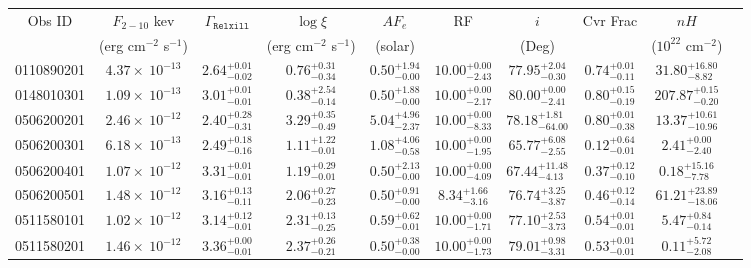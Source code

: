 \documentclass{article}
\begin{document}
\begin{landscape}
\begin{longtable}{cccccccccl}
\hline \multicolumn{1}{c}{Obs ID} & \multicolumn{1}{c}{$F_{2-10}$ kev} & \multicolumn{1}{c}{$\Gamma_\texttt{Relxill}$} & \multicolumn{1}{c}{$\log \xi$} & \multicolumn{1}{c}{$AF_e$} & \multicolumn{1}{c}{RF} & \multicolumn{1}{c}{$\textit{i}$} & \multicolumn{1}{c}{Cvr Frac} & \multicolumn{1}{c}{$nH$}\\  
\multicolumn{1}{c}{} & \multicolumn{1}{c}{(erg cm$^{-2}$ s$^{-1}$)} & \multicolumn{1}{c}{} & \multicolumn{1}{c}{(erg cm$^{-2}$ s$^{-1}$)} & \multicolumn{1}{c}{(solar)} & \multicolumn{1}{c}{} & \multicolumn{1}{c}{(Deg)} & \multicolumn{1}{c}{} & \multicolumn{1}{l}{($10^{22}$ cm$^{-2}$)}\\ \hline 
0110890201 & $4.37 \times~10^{-13}$ & $2.64^{+0.01}_{-0.02}$ & $0.76^{+0.31}_{-0.34}$ & $0.50^{+1.94}_{-0.00}$ & $10.00^{+0.00}_{-2.43}$ & $77.95^{+2.04}_{-0.30}$ &  $0.74^{+0.01}_{-0.11}$ & $31.80^{+16.80}_{-8.82}$ \\
0148010301 & $1.09 \times~10^{-13}$ & $3.01^{+0.01}_{-0.01}$ & $0.38^{+2.54}_{-0.14}$ & $0.50^{+1.88}_{-0.00}$ & $10.00^{+0.00}_{-2.17}$ & $80.00^{+0.00}_{-2.41}$ &  $0.80^{+0.15}_{-0.19}$ & $207.87^{+0.15}_{-0.20}$  \\
0506200201 & $2.46 \times~10^{-12}$ & $2.40^{+0.28}_{-0.31}$ & $3.29^{+0.35}_{-0.49}$ & $5.04^{+4.96}_{-2.37}$ & $10.00^{+0.00}_{-8.33}$ & $78.18^{+1.81}_{-64.00}$ &  $0.80^{+0.01}_{-0.38}$ & $13.37^{+10.61}_{-10.96}$\\
0506200301 & $6.18 \times~10^{-13}$ & $2.49^{+0.18}_{-0.16}$ & $1.11^{+1.22}_{-0.01}$ & $1.08^{+4.06}_{-0.58}$ & $10.00^{+0.00}_{-1.95}$ & $65.77^{+6.08}_{-2.55}$ &  $0.12^{+0.64}_{-0.01}$ & $2.41^{+0.00}_{-2.40}$\\ 
0506200401 & $1.07 \times~10^{-12}$ & $3.31^{+0.01}_{-0.01}$ & $1.19^{+0.29}_{-0.01}$ & $0.50^{+2.13}_{-0.00}$ & $10.00^{+0.00}_{-4.09}$ & $67.44^{+11.48}_{-4.13}$ &  $0.37^{+0.12}_{-0.10}$ & $0.18^{+15.16}_{-7.78}$ \\ 
0506200501 & $1.48 \times~10^{-12}$ & $3.16^{+0.13}_{-0.11}$ & $2.06^{+0.27}_{-0.23}$ & $0.50^{+0.91}_{-0.00}$ & $8.34^{+1.66}_{-3.16}$ & $76.74^{+3.25}_{-3.87}$ &  $0.46^{+0.12}_{-0.14}$ & $61.21^{+23.89}_{-18.06}$ \\ 
0511580101 & $1.02 \times~10^{-12}$ & $3.14^{+0.12}_{-0.01}$ & $2.31^{+0.13}_{-0.25}$ & $0.59^{+0.62}_{-0.01}$ & $10.00^{+0.00}_{-1.71}$ & $77.10^{+2.53}_{-3.73}$ &  $0.54^{+0.01}_{-0.01}$ & $5.47^{+0.84}_{-0.14}$   \\ 
0511580201 & $1.46 \times~10^{-12}$ & $3.36^{+0.00}_{-0.01}$ & $2.37^{+0.26}_{-0.21}$ & $0.50^{+0.38}_{-0.00}$ & $10.00^{+0.00}_{-1.73}$ & $79.01^{+0.98}_{-3.31}$ &  $0.53^{+0.01}_{-0.01}$ & $0.11^{+5.72}_{-2.08}$\\ 

\end{longtable}
\end{landscape}
\end{document}
